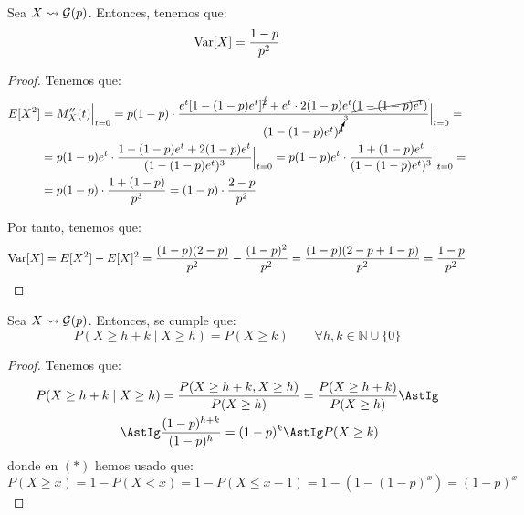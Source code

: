 \begin{coro}
    Sea $X\leadsto \mathcal{G}(p)$. Entonces, tenemos que:
    \begin{equation*}
        \operatorname{Var}[X] = \frac{1-p}{p^2}
    \end{equation*}
\end{coro}
\begin{proof}
    Tenemos que:
    \begin{align*}
        E[X^2] &= M_X''(t)\Big|_{t=0} = p(1-p)\cdot \dfrac{e^t[1-(1-p)e^t]^{\cancel{2}} + e^t\cdot 2(1-p)e^t\cancel{(1-(1-p)e^t)}}{(1-(1-p)e^t)^{\cancelto{3}{4}}}\Big|_{t=0} =\\
        &= p(1-p)e^t\cdot \dfrac{1-(1-p)e^t + 2(1-p)e^t}{(1-(1-p)e^t)^3}\Big|_{t=0}
        = p(1-p)e^t\cdot \dfrac{1+(1-p)e^t}{(1-(1-p)e^t)^3}\Big|_{t=0} =\\
        &= p(1-p)\cdot \dfrac{1+(1-p)}{p^3}
        = (1-p)\cdot \dfrac{2-p}{p^2}
    \end{align*}

    Por tanto, tenemos que:
    \begin{equation*}
        \operatorname{Var}[X] = E[X^2] - E[X]^2
        = \dfrac{(1-p)(2-p)}{p^2} - \dfrac{(1-p)^2}{p^2}
        = \dfrac{(1-p)(2-p+1-p)}{p^2} = \dfrac{1-p}{p^2}
    \end{equation*}
\end{proof}

\begin{prop}
    Sea $X\leadsto \mathcal{G}(p)$. Entonces, se cumple que:
    \begin{equation*}
        P(X\geq h + k \mid X\geq h) = P(X\geq k) \qquad \forall h,k \in \mathbb{N}\cup \{0\}
    \end{equation*}
    \begin{proof}
        Tenemos que:
        \begin{align*}
            P(X\geq h + k \mid X\geq h) &= \frac{P(X\geq h+k, X\geq h)}{P(X\geq h)} = \frac{P(X\geq h+k)}{P(X\geq h)} \AstIg\\
            \AstIg & \dfrac{(1-p)^{h+k}}{(1-p)^h} = (1-p)^k \AstIg P(X\geq k)
        \end{align*}
        donde en $(\ast)$ hemos usado que:
        \begin{equation*}
            P(X\geq x) = 1-P(X<x) = 1-P(X\leq x-1) = 1-(1-(1-p)^x) = (1-p)^x
        \end{equation*}
    \end{proof}
\end{prop}

